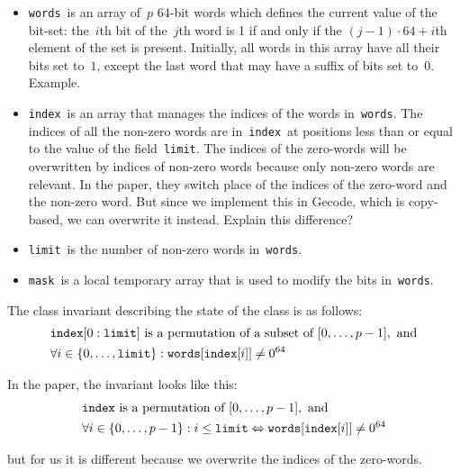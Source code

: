 \documentclass[a4paper,11pt]{article}
\newcommand{\Todo}[1]{{\color{blue}#1}}
\newcommand{\Words}{\texttt{words}}
\newcommand{\Index}{\texttt{index}}
\newcommand{\Mask}{\texttt{mask}}
\newcommand{\Limit}{\texttt{limit}}
\newcommand{\SparseBitSet}{\texttt{SparseBitSet}}
\numberwithin{equation}{section}
\begin{document}
\begin{itemize}
  \item \Words~is an array of~$p$ 64-bit words which defines the current value of the bit-set:
    the~$i$th bit of the~$j$th word is 1 if and only if the $(j-1) \cdot 64 + i$th element of
    the set is present. Initially, all words in this array have all their bits set to~$1$,
    except the last word that may have a suffix of bits set to~$0$. \Todo{Example.}
  \item \Index~is an array that manages the indices of the words in~\Words. The
    indices of all the non-zero words are in~\Index~at positions less than or
    equal to the value of the field~\Limit.
    The indices of the zero-words will be overwritten by indices of non-zero words
    because only non-zero words are relevant. \Todo{In the paper, they switch place
    of the indices of the zero-word and the non-zero word. But since we implement this
    in Gecode, which is copy-based, we
    can overwrite it instead. Explain this difference?}
  \item \Limit~is the number of non-zero words in~\Words.

  \item \Mask~is a local temporary array that is used to modify the bits in~\Words.
    
\end{itemize}

\noindent
The class invariant describing the state of the class is as follows:
\begin{alignat}{1}
  &\Index[0:\Limit]~\text{is a permutation of a subset of~} [0,\dots,p-1],\text{~and} \\
  &\forall i \in \Set{0,\dots,\Limit}: \Words[\Index[i]] \neq 0^{64}
\end{alignat}

\Todo{In the paper, the invariant looks like this:
\begin{alignat}{1}
  &\Index~\text{is a permutation of~} [0,\dots,p-1],\text{~and} \\
  &\forall i \in \Set{0,\dots,p-1}: i \leq \Limit \Leftrightarrow \Words[\Index[i]] \neq 0^{64}
\end{alignat}

but for us it is different because we overwrite the indices of the zero-words.
}
\end{document}
